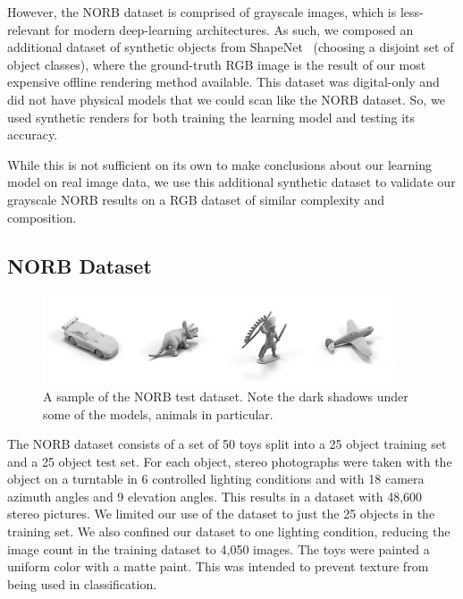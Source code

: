 \documentclass[10pt,twocolumn,letterpaper]{article}
\begin{document}
However, the NORB dataset is comprised of grayscale images, which is less-relevant for modern deep-learning architectures. As such, we composed an additional dataset of synthetic objects from ShapeNet~\cite{DBLP:journals/corr/ChangFGHHLSSSSX15} (choosing a disjoint set of object classes), where the ground-truth RGB image is the result of our most expensive offline rendering method available. This dataset was digital-only and did not have physical models that we could scan like the NORB dataset. So, we used synthetic renders for both training the learning model and testing its accuracy.

While this is not sufficient on its own to make conclusions about our learning model on real image data, we use this additional synthetic dataset to validate our grayscale NORB results on a RGB dataset of similar complexity and composition. %

\subsection{NORB Dataset}\label{NORB-DATASET}
\begin{figure}[h!]
\centering
\includegraphics[width=1.0\columnwidth]{./assets/NORBTestSmall.png}
\caption{A sample of the NORB test dataset. Note the dark shadows under some of the models, animals in particular.}
\label{fig:norb-samples}
\end{figure}

The NORB dataset consists of a set of 50 toys split into a 25 object training set and a 25 object test set. For each object, stereo photographs were taken with the object on a turntable in 6 controlled lighting conditions and with 18 camera azimuth angles and 9 elevation angles. This results in a dataset with 48,600 stereo pictures.  We limited our use of the dataset to just the 25 objects in the training set. We also confined our dataset to one lighting condition, reducing the image count in the training dataset to 4,050 images. The toys were painted a uniform color with a matte paint. This was intended to prevent texture from being used in classification.
\end{document}
